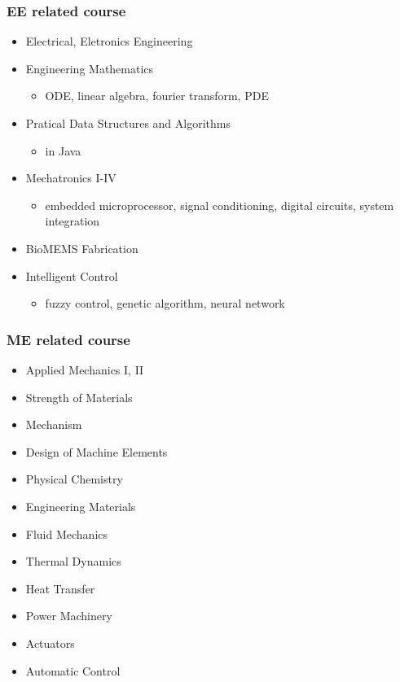 \documentclass[compress]{beamer}
\begin{document}
\begin{frame}
    \frametitle{EE related course}
    \begin{itemize}
        \item Electrical, Eletronics Engineering
        \item Engineering Mathematics
              \begin{itemize}
                  \item ODE, linear algebra, fourier transform, PDE
              \end{itemize}
        \item Pratical Data Structures and Algorithms
              \begin{itemize}
                  \item in Java
              \end{itemize}
        \item Mechatronics I-IV
              \begin{itemize}
                  \item embedded microprocessor, signal conditioning, digital circuits, system integration
              \end{itemize}
        \item BioMEMS Fabrication
        \item Intelligent Control
              \begin{itemize}
                  \item fuzzy control, genetic algorithm, neural network
              \end{itemize}
    \end{itemize}
\end{frame}

\begin{frame}
    \frametitle{ME related course}
    \begin{multicols}{2}
        \begin{itemize}
            \item Applied Mechanics I, II
            \item Strength of Materials
            \item Mechanism
            \item Design of Machine Elements
            \item Physical Chemistry
            \item Engineering Materials
            \item Fluid Mechanics
            \item Thermal Dynamics
            \item Heat Transfer
            \item Power Machinery
            \item Actuators
            \item Automatic Control
        \end{itemize}
    \end{multicols}
\end{frame}
\end{document}
